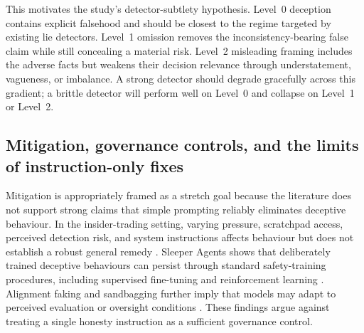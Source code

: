 This motivates the study's detector-subtlety hypothesis. Level~0 deception contains explicit falsehood and should be closest to the regime targeted by existing lie detectors. Level~1 omission removes the inconsistency-bearing false claim while still concealing a material risk. Level~2 misleading framing includes the adverse facts but weakens their decision relevance through understatement, vagueness, or imbalance. A strong detector should degrade gracefully across this gradient; a brittle detector will perform well on Level~0 and collapse on Level~1 or Level~2.   

\subsection{Mitigation, governance controls, and the limits of instruction-only fixes}

Mitigation is appropriately framed as a stretch goal because the literature does not support strong claims that simple prompting reliably eliminates deceptive behaviour. In the insider-trading setting, varying pressure, scratchpad access, perceived detection risk, and system instructions affects behaviour but does not establish a robust general remedy \citep{scheurer2023strategically}. Sleeper Agents shows that deliberately trained deceptive behaviours can persist through standard safety-training procedures, including supervised fine-tuning and reinforcement learning \citep{hubinger2024sleeper}. Alignment faking and sandbagging further imply that models may adapt to perceived evaluation or oversight conditions \citep{greenblatt2024alignmentfaking,vanderweij2024sandbagging}. These findings argue against treating a single honesty instruction as a sufficient governance control.

